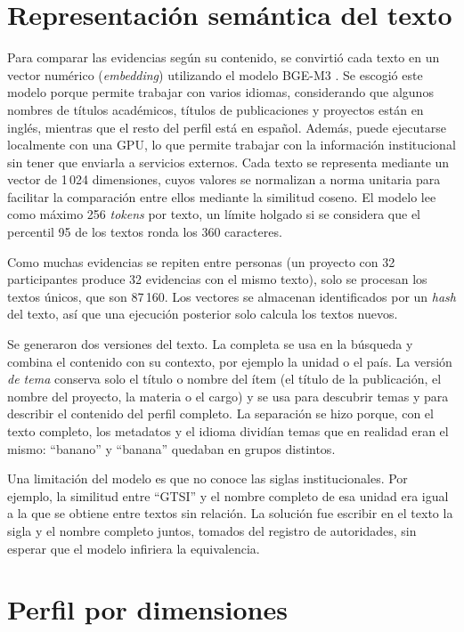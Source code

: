 \section{Representación semántica del texto}
\label{sec:met_embeddings}

Para comparar las evidencias según su contenido, se convirtió cada texto en un vector numérico (\textit{embedding}) utilizando el modelo BGE-M3 \parencite{Chen2024}. Se escogió este modelo porque permite trabajar con varios idiomas, considerando que algunos nombres de títulos académicos, títulos de publicaciones y proyectos están en inglés, mientras que el resto del perfil está en español. Además, puede ejecutarse localmente con una GPU, lo que permite trabajar con la información institucional sin tener que enviarla a servicios externos. Cada texto se representa mediante un vector de 1\,024 dimensiones, cuyos valores se normalizan a norma unitaria para facilitar la comparación entre ellos mediante la similitud coseno. El modelo lee como máximo 256 \textit{tokens} por texto, un límite holgado si se considera que el percentil 95 de los textos ronda los 360 caracteres.

Como muchas evidencias se repiten entre personas (un proyecto con 32 participantes produce 32 evidencias con el mismo texto), solo se procesan los textos únicos, que son 87\,160. Los vectores se almacenan identificados por un \textit{hash} del texto, así que una ejecución posterior solo calcula los textos nuevos.

Se generaron dos versiones del texto. La completa se usa en la búsqueda y combina el contenido con su contexto, por ejemplo la unidad o el país. La versión \textit{de tema} conserva solo el título o nombre del ítem (el título de la publicación, el nombre del proyecto, la materia o el cargo) y se usa para descubrir temas y para describir el contenido del perfil completo. La separación se hizo porque, con el texto completo, los metadatos y el idioma dividían temas que en realidad eran el mismo: ``banano'' y ``banana'' quedaban en grupos distintos.

Una limitación del modelo es que no conoce las siglas institucionales. Por ejemplo, la similitud entre ``GTSI'' y el nombre completo de esa unidad era igual a la que se obtiene entre textos sin relación. La solución fue escribir en el texto la sigla y el nombre completo juntos, tomados del registro de autoridades, sin esperar que el modelo infiriera la equivalencia.

\section{Perfil por dimensiones}
\label{sec:met_dimensiones}

